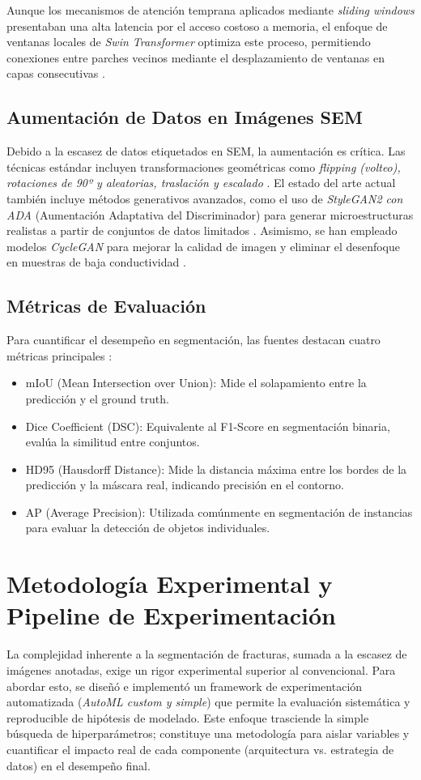 \documentclass[onecolumn, 12pt , journal]{IEEEtran}
\begin{document}
Aunque los mecanismos de atención temprana aplicados mediante \textit{sliding windows} presentaban una alta latencia por el acceso costoso a memoria, el enfoque de ventanas locales de \emph{Swin Transformer} optimiza este proceso, permitiendo conexiones entre parches vecinos mediante el desplazamiento de ventanas en capas consecutivas \cite{liu2021swin}.

\subsection{Aumentación de Datos en Imágenes SEM}
Debido a la escasez de datos etiquetados en SEM, la aumentación es crítica. Las técnicas estándar incluyen transformaciones geométricas como \emph{flipping (volteo), rotaciones de 90º y aleatorias, traslación y escalado} \cite{monchot2021titanium, gaox2024cyclegan}. El estado del arte actual también incluye métodos generativos avanzados, como el uso de \emph{StyleGAN2 con ADA} (Aumentación Adaptativa del Discriminador) para generar microestructuras realistas a partir de conjuntos de datos limitados \cite{lambard2023stylegan}. Asimismo, se han empleado modelos \emph{CycleGAN} para mejorar la calidad de imagen y eliminar el desenfoque en muestras de baja conductividad \cite{gaox2024cyclegan}.

\subsection{Métricas de Evaluación}
Para cuantificar el desempeño en segmentación, las fuentes destacan cuatro métricas principales \cite{classification_report, cao2021swinunet}:
\begin{itemize}
    \item mIoU (Mean Intersection over Union): Mide el solapamiento entre la predicción y el ground truth.
    \item Dice Coefficient (DSC): Equivalente al F1-Score en segmentación binaria, evalúa la similitud entre conjuntos.
    \item HD95 (Hausdorff Distance): Mide la distancia máxima entre los bordes de la predicción y la máscara real, indicando precisión en el contorno.
    \item AP (Average Precision): Utilizada comúnmente en segmentación de instancias para evaluar la detección de objetos individuales.
\end{itemize}


\section{Metodología Experimental y Pipeline de Experimentación}
La complejidad inherente a la segmentación de fracturas, sumada a la escasez de imágenes anotadas, exige un rigor experimental superior al convencional. Para abordar esto, se diseñó e implementó un framework de experimentación automatizada (\textit{AutoML custom y simple}) que permite la evaluación sistemática y reproducible de hipótesis de modelado.
Este enfoque trasciende la simple búsqueda de hiperparámetros; constituye una metodología para aislar variables y cuantificar el impacto real de cada componente (arquitectura vs. estrategia de datos) en el desempeño final.
\end{document}
